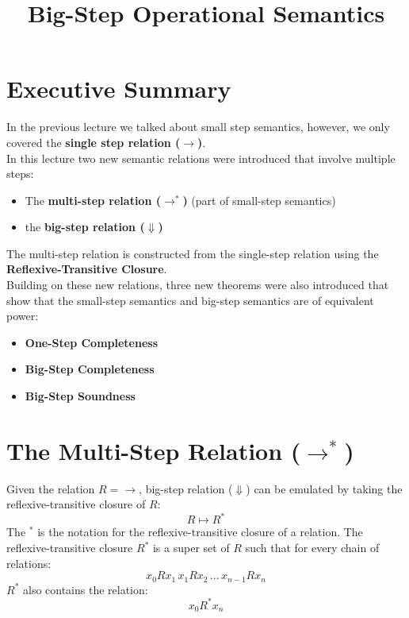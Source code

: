 \documentclass{lecturenotes}
\title{Big-Step Operational Semantics}
\newcommand{\singlestep}{\ensuremath{\rightarrow}}
\newcommand{\multistep}{\ensuremath{\rightarrow^*}}
\newcommand{\bigstep}{\ensuremath{\Downarrow}}
\begin{document}
\maketitle

\section{Executive Summary}
\label{sec:executive-summary}

In the previous lecture we talked about small step semantics, however, we only covered the \textbf{single step relation (\singlestep)}. \\

\noindent
In this lecture two new semantic relations were introduced that involve multiple steps:
\begin{itemize}
\item The \textbf{multi-step relation (\multistep)} (part of small-step semantics)
\item the \textbf{big-step relation (\bigstep)}
\end{itemize}

\noindent
The multi-step relation is constructed from the single-step relation using the \textbf{Reflexive-Transitive Closure}. \\

\noindent
Building on these new relations, three new theorems were also introduced that show that the small-step semantics and big-step semantics are of equivalent power:
\begin{itemize}
\item \textbf{One-Step Completeness}
\item \textbf{Big-Step Completeness}
\item \textbf{Big-Step Soundness}
\end{itemize}

\section{The Multi-Step Relation (\multistep)}
\label{sec:multi-step-relation}

Given the relation $R = \singlestep$, big-step relation (\bigstep) can be emulated by taking the reflexive-transitive closure of $R$:
$$R \mapsto R^*$$
The ${}^*$ is the notation for the reflexive-transitive closure of a relation. The reflexive-transitive closure $R^*$ is a super set of $R$ such that for every chain of relations:
$$x_{0}Rx_{1} \, x_{1}Rx_{2} \, ... \, x_{n-1}Rx_{n}$$
$R^*$ also contains the relation:
$$x_{0}R^*x_{n}$$
\end{document}
